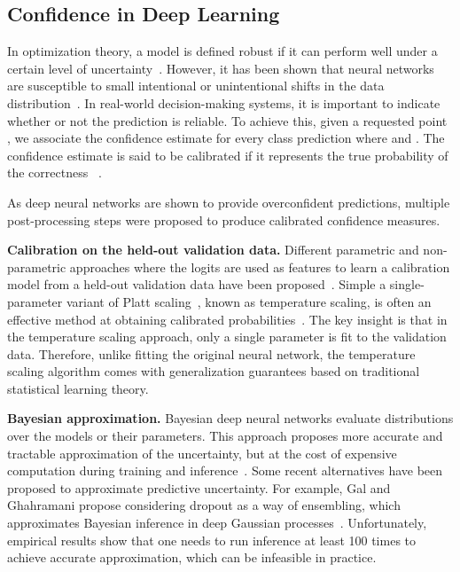 \documentclass{article}
\begin{document}
\subsection{Confidence in Deep Learning}

In optimization theory, a model is defined robust if it can perform well under a certain level of uncertainty~\cite{b50}.
However, it has been shown that neural networks are susceptible to small intentional or unintentional shifts in the data distribution~\cite{b37, b53}.
In real-world decision-making systems, it is important to indicate whether or not the prediction is reliable.
To achieve this, given a requested point ,
we associate the confidence estimate  for every class prediction 
where  and .
The confidence estimate  is said to be calibrated if it represents the true probability of the correctness ~\cite{b68}.

As deep neural networks are shown to provide overconfident predictions, multiple post-processing steps were proposed to produce calibrated confidence measures.

\textbf{Calibration on the held-out validation data.} Different parametric and non-parametric approaches where the logits are used as features to learn a calibration model from a held-out validation data have been proposed~\cite{b68, confidence_bayesian_binning, confidence_histogram_binning, confidence_isotonic_regression}.  Simple a single-parameter variant of Platt
scaling~\cite{platt_scalling}, known as temperature scaling, is often an effective method at obtaining calibrated probabilities~\cite{b68, pac}.
The key insight is that in the temperature scaling approach, only a single parameter is fit to the validation data. Therefore,  unlike fitting the original neural network, the temperature scaling algorithm comes with generalization guarantees based on traditional statistical learning theory.

\textbf{Bayesian approximation.} Bayesian deep neural networks evaluate distributions over the models or their parameters. This approach proposes more accurate and tractable approximation of the uncertainty, but at the cost of expensive computation during training and inference~\cite{b42}. Some recent alternatives have been proposed to approximate predictive uncertainty. For example, Gal and Ghahramani propose considering dropout as a way of ensembling, which approximates Bayesian inference in deep Gaussian processes~\cite{b41}. Unfortunately, empirical results show that one needs to run inference at least 100 times to achieve accurate approximation, which can be infeasible in practice.
\end{document}
